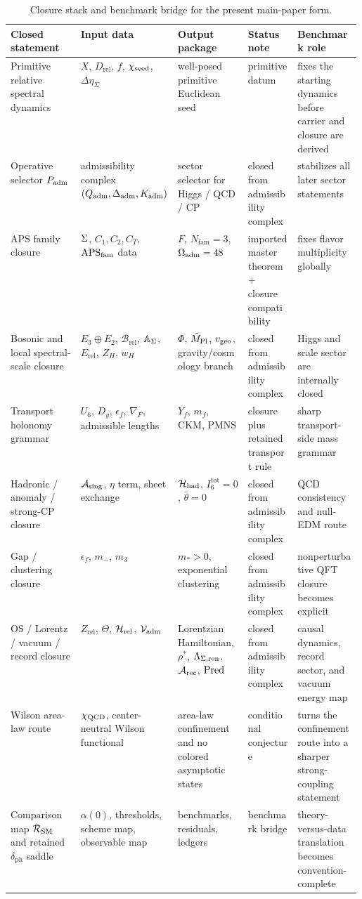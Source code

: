 \begin{table}[t]
\centering
\small
\begin{tabularx}{\linewidth}{@{}>{\raggedright\arraybackslash}p{0.20\linewidth}>{\raggedright\arraybackslash}p{0.18\linewidth}>{\raggedright\arraybackslash}p{0.20\linewidth}YY@{}}
\toprule
Closed statement & Input data & Output package & Status note & Benchmark role \\
\midrule
Primitive relative spectral dynamics & $X$, $D_{\mathrm{rel}}$, $f$, $\chi_{\mathrm{seed}}$, $\Delta\eta_\Sigma$ & well-posed primitive Euclidean seed & primitive datum & fixes the starting dynamics before carrier and closure are derived \\
Operative selector $P_{\mathrm{adm}}$ & admissibility complex $(Q_{\mathrm{adm}},\Delta_{\mathrm{adm}},K_{\mathrm{adm}})$ & sector selector for Higgs / QCD / CP & closed from admissibility complex & stabilizes all later sector statements \\
APS family closure & $\Sigma$, $C_1,C_2,C_T$, $\mathrm{APS}_{\mathrm{fam}}$ data & $F$, $N_{\mathrm{fam}}=3$, $\Omega_{\mathrm{adm}}=48$ & imported master theorem + closure compatibility & fixes flavor multiplicity globally \\
Bosonic and local spectral-scale closure & $E_3\oplus E_2$, $\mathcal B_{\mathrm{rel}}$, $\mathbb A_{\Sigma}$, $E_{\mathrm{rel}}$, $Z_H$, $w_H$ & $\Phi$, $\bar M_{\mathrm{Pl}}$, $v_{\mathrm{geo}}$, gravity/cosmology branch & closed from admissibility complex & Higgs and scale sector are internally closed \\
Transport holonomy grammar & $U_6$, $D_y$, $\epsilon_f$, $\nabla_F$, admissible lengths & $Y_f$, $m_f$, CKM, PMNS & closure plus retained transport rule & sharp transport-side mass grammar \\
Hadronic / anomaly / strong-CP closure & $\mathcal A_{\mathrm{sing}}$, $\eta$ term, sheet exchange & $\mathcal H_{\mathrm{had}}$, $I_6^{\mathrm{tot}}=0$, $\bar\theta=0$ & closed from admissibility complex & QCD consistency and null-EDM route \\
Gap / clustering closure & $\epsilon_f$, $m_-$, $m_3$ & $m_*>0$, exponential clustering & closed from admissibility complex & nonperturbative QFT closure becomes explicit \\
OS / Lorentz / vacuum / record closure & $Z_{\mathrm{rel}}$, $\Theta$, $\mathcal H_{\mathrm{rel}}$, $\mathcal V_{\mathrm{adm}}$ & Lorentzian Hamiltonian, $\rho^\ast$, $\Lambda_{\Sigma,\mathrm{ren}}$, $\mathcal A_{\mathrm{rec}}$, $\operatorname{Pred}$ & closed from admissibility complex & causal dynamics, record sector, and vacuum energy map \\
Wilson area-law route & $\chi_{\mathrm{QCD}}$, center-neutral Wilson functional & area-law confinement and no colored asymptotic states & conditional conjecture & turns the confinement route into a sharper strong-coupling statement \\
Comparison map $\mathcal R_{\mathrm{SM}}$ and retained $\delta_{\mathrm{ph}}$ saddle & $\alpha(0)$, thresholds, scheme map, observable map & benchmarks, residuals, ledgers & benchmark bridge & theory-versus-data translation becomes convention-complete \\
\bottomrule
\end{tabularx}
\caption{Closure stack and benchmark bridge for the present main-paper form.}
\label{tab:proof-obligations}
\end{table}

